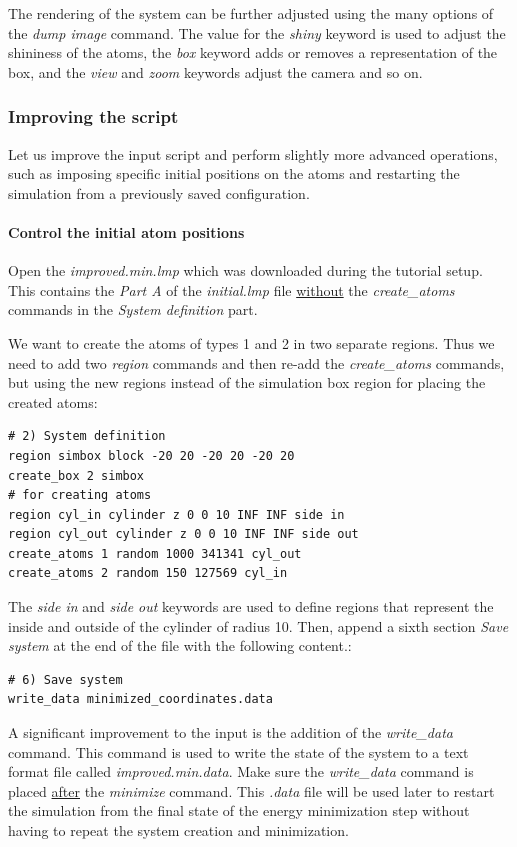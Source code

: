 \documentclass[9pt,tutorial]{livecoms}
\renewcommand{\emph}[1]{\underline{#1}}
\begin{document}
The rendering of the system can be further adjusted using the many
options of the \textit{dump image} command.  The value for the
\textit{shiny} keyword is used to adjust the shininess of the atoms, the
\textit{box} keyword adds or removes a representation of the box, and
the \textit{view} and \textit{zoom} keywords adjust the camera and so
on.

\subsubsection{Improving the script}

Let us improve the input script and perform slightly more advanced operations,
such as imposing specific initial positions on the atoms and restarting the
simulation from a previously saved configuration.

\paragraph{Control the initial atom positions}
Open the \textit{improved.min.lmp} which was downloaded during the
tutorial setup.  This contains the \textit{Part A} of the
\textit{initial.lmp} file \emph{without} the \textit{create\_atoms}
commands in the \textit{System definition} part.

We want to create the atoms of types 1 and 2 in two separate
regions.  Thus we need to add two \textit{region} commands and then
re-add the \textit{create\_atoms} commands, but using the new regions
instead of the simulation box region for placing the created atoms:
\begin{lstlisting}
# 2) System definition
region simbox block -20 20 -20 20 -20 20
create_box 2 simbox
# for creating atoms
region cyl_in cylinder z 0 0 10 INF INF side in
region cyl_out cylinder z 0 0 10 INF INF side out
create_atoms 1 random 1000 341341 cyl_out
create_atoms 2 random 150 127569 cyl_in
\end{lstlisting}
The \textit{side in} and \textit{side out} keywords are used to define
regions that represent the inside and outside of the cylinder of radius
10. Then, append a sixth section \textit{Save system} at the end of the
file with the following content.:
\begin{lstlisting}
# 6) Save system
write_data minimized_coordinates.data
\end{lstlisting}

A significant improvement to the input is the addition of the
\textit{write\_data} command.  This command is used to write the state
of the system to a text format file called \textit{improved.min.data}.
Make sure the \textit{write\_data} command is placed \emph{after} the
\textit{minimize} command.  This \textit{.data} file will be used later
to restart the simulation from the final state of the energy
minimization step without having to repeat the system creation and
minimization.
\end{document}
